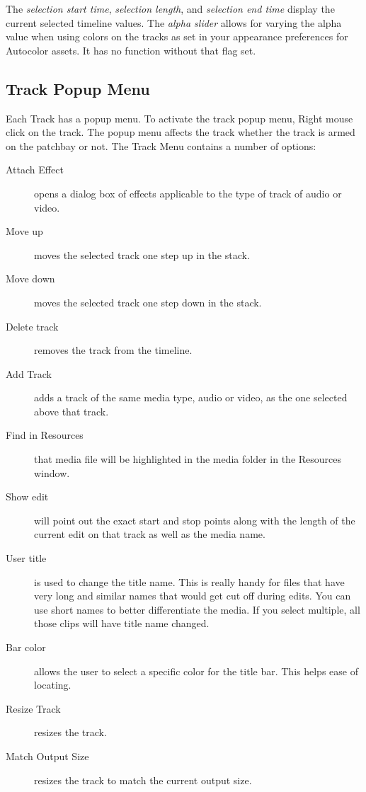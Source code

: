 The \emph{selection start time}, \emph{selection length}, and \emph{selection end time} display the current selected timeline values.  
The \emph{alpha slider} allows for varying the alpha value when using colors on the tracks as set in your appearance preferences for Autocolor assets.  
It has no function without that flag set.

\subsection{Track Popup Menu}%
\label{sub:track_popup_menu}

Each Track has a popup menu. 
To activate the track popup menu, Right mouse click on the track. 
The popup menu affects the track whether the track is armed on the patchbay or not. 
The Track Menu contains a number of options:

\begin{description}
    \item[Attach Effect] opens a dialog box of effects applicable to the type of track of audio or video.
    \item[Move up] moves the selected track one step up in the stack.
    \item[Move down]  moves the selected track one step down in the stack.
    \item[Delete track]  removes the track from the timeline.
    \item[Add Track]  adds a track of the same media type, audio or video, as the one selected above that track.
    \item[Find in Resources]  that media file will be highlighted in the media folder in the Resources window.
    \item[Show edit]  will point out the exact start and stop points along with the length of the current edit on
        that track as well as the media name.
    \item[User title]  is used to change the title name.  This is really handy for files that have very long and
        similar names that would get cut off during edits.  You can use short names to better differentiate the
        media. If you select multiple, all those clips will have title name changed.
    \item[Bar color]  allows the user to select a specific color for the title bar.  This helps ease of locating.
    \item[Resize Track]  resizes the track.
    \item[Match Output Size]  resizes the track to match the current output size.
\end{description}


